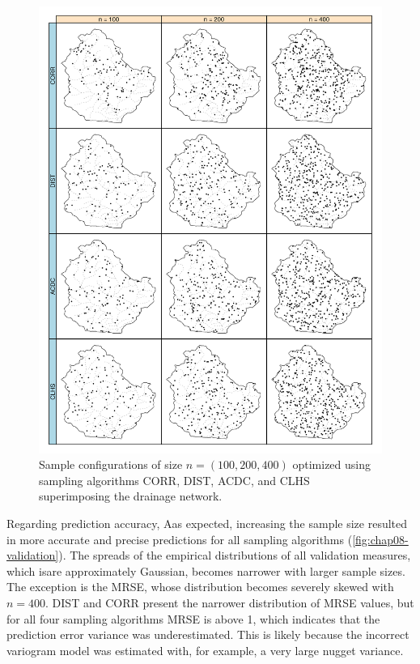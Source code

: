 \begin{figure}[!ht]
 \centering
 \includegraphics[width=\textwidth]{fig/chap08-points-corr-dist-acdc-clhs}

 \caption[Sample configurations optimized using four sampling algorithms.]{Sample configurations of size 
 $n = (100, 200, 400)$ optimized using sampling algorithms CORR, DIST,  ACDC, and CLHS superimposing the
 drainage network.}
 \label{fig:chap08-points}
\end{figure}

Regarding prediction accuracy, Aas expected, increasing the sample size resulted in more accurate and precise 
predictions for all sampling algorithms (\autoref{fig:chap08-validation}). The spreads of the empirical 
distributions of all validation measures, which isare approximately Gaussian, becomes narrower with larger 
sample sizes. The exception is the MRSE, whose distribution becomes severely skewed with $n = 400$. DIST and 
CORR present the narrower distribution of MRSE values, but for all four sampling algorithms MRSE is above 1, 
which indicates that the prediction error variance was underestimated. This is likely because the incorrect 
variogram model was estimated with, for example, a very large nugget variance.

